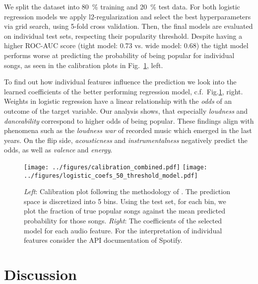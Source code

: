 \documentclass{article}
\begin{document}
We split the dataset into \SI{80}{\percent} training and \SI{20}{\percent} test data.
For both logistic regression models we apply l2-regularization and select the best hyperparameters via grid search, using 5-fold cross validation. 
Then, the final models are evaluated on individual test sets, respecting their popularity threshold.
Despite having a higher ROC-AUC score (tight model: \num{0.73} vs. wide model: \num{0.68}) the tight model performs worse at predicting the probability of being popular for individual songs, as seen in the calibration plots in Fig.~\ref{fig:logis_eval}, left.

To find out how individual features influence the prediction we look into the learned coefficients of the better performing regression model, c.f.~Fig.\ref{fig:logis_eval}, right.
Weights in logistic regression have a linear relationship with the \textit{odds} of an outcome of the target variable.
Our analysis shows, that especially \textit{loudness} and \textit{danceability} correspond to higher odds of being popular.
These findings align with phenomena such as the \textit{loudness war}\cite{vickers2010loudness} of recorded music which emerged in the last years.
On the flip side, \emph{acousticness} and \emph{instrumentalness} negatively predict the odds, as well as \emph{valence} and \emph{energy}.


\begin{figure}
  \texttt{[image: ../figures/calibration\_combined.pdf]}
  \qquad
  \texttt{[image: ../figures/logistic\_coefs\_50\_threshold\_model.pdf]}
  \caption{\textit{Left}: Calibration plot following the methodology of \cite{niculescu-mizilPredictingGoodProbabilities2005}. The prediction space is discretized into 5 bins. Using the test set, for each bin, we plot the fraction of true popular songs against the mean predicted probability for those songs. \textit{Right}: The coefficients of the selected model for each audio feature. For the interpretation of individual features consider the API documentation of Spotify.}
  \label{fig:logis_eval}
\end{figure}

  

\section{Discussion}
\end{document}

